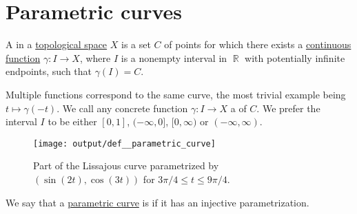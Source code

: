 \section{Parametric curves}\label{sec:parametric_curves}

\begin{definition}\label{def:parametric_curve}\mimprovised
  A  in a \hyperref[def:topological_space]{topological space} \( X \) is a set \( C \) of points for which there exists a \hyperref[def:global_continuity]{continuous function} \( \gamma: I \to X \), where \( I \) is a nonempty interval in \( \BbbR \) with potentially infinite endpoints, such that \( \gamma(I) = C \).

  Multiple functions correspond to the same curve, the most trivial example being \( t \mapsto \gamma(-t) \). We call any concrete function \( \gamma: I \to X \) a  of \( C \). We prefer the interval \( I \) to be either \( [0, 1] \), \( (-\infty, 0] \), \( [0, \infty) \) or \( (-\infty, \infty) \).

  \begin{figure}[!ht]
    \centering
    \texttt{[image: output/def\_\_parametric\_curve]}
    \caption{Part of the Lissajous curve parametrized by \( (\sin(2t), \cos(3t)) \) for \( 3 \pi / 4 \leq t \leq 9 \pi / 4 \).}\label{fig:def:parametric_curve}
  \end{figure}
\end{definition}

\begin{definition}\label{def:simple_curve}\mimprovised
  We say that a \hyperref[def:parametric_curve]{parametric curve} is  if it has an injective parametrization.
\end{definition}

